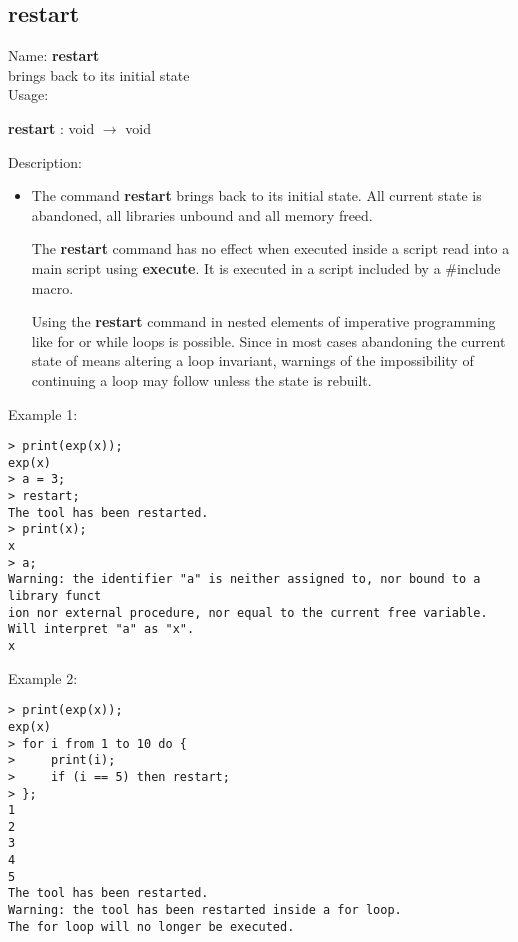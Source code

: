 \subsection{restart}
\label{labrestart}
\noindent Name: \textbf{restart}\\
brings \sollya back to its initial state\\

\noindent Usage: 
\begin{center}
\textbf{restart} : \textsf{void} $\rightarrow$ \textsf{void}\\
\end{center}
\noindent Description: \begin{itemize}

\item The command \textbf{restart} brings \sollya back to its initial state.  All
   current state is abandoned, all libraries unbound and all memory freed.
    
   The \textbf{restart} command has no effect when executed inside a \sollya
   script read into a main \sollya script using \textbf{execute}. It is executed
   in a \sollya script included by a $\#$include macro.
    
   Using the \textbf{restart} command in nested elements of imperative
   programming like for or while loops is possible. Since in most cases
   abandoning the current state of \sollya means altering a loop
   invariant, warnings of the impossibility of continuing a loop may
   follow unless the state is rebuilt.
\end{itemize}
\noindent Example 1: 
\begin{center}\begin{minipage}{15cm}\begin{Verbatim}[frame=single]
> print(exp(x));
exp(x)
> a = 3;
> restart;
The tool has been restarted.
> print(x);
x
> a;
Warning: the identifier "a" is neither assigned to, nor bound to a library funct
ion nor external procedure, nor equal to the current free variable.
Will interpret "a" as "x".
x
\end{Verbatim}
\end{minipage}\end{center}
\noindent Example 2: 
\begin{center}\begin{minipage}{15cm}\begin{Verbatim}[frame=single]
> print(exp(x));
exp(x)
> for i from 1 to 10 do {
>     print(i);
>     if (i == 5) then restart;
> };
1
2
3
4
5
The tool has been restarted.
Warning: the tool has been restarted inside a for loop.
The for loop will no longer be executed.
\end{Verbatim}
\end{minipage}\end{center}
